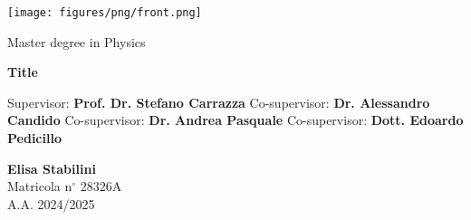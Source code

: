 \frontmatter
{
\thispagestyle{empty}

\centerline{
\texttt{[image: figures/png/front.png]}
}

\begin{center}
{\Large  Master degree in Physics }
\end{center}


\vskip1.5cm
\begin{center}
{\fontsize{15}{20}\selectfont \textbf{Title\\}}
\end{center}


{\large
\vskip 20mm Supervisor:
\vskip 0.2mm \large  \textbf{Prof. Dr. Stefano Carrazza}
\vskip 5mm
\large Co-supervisor:
\vskip 0.2mm
\large \textbf{Dr. Alessandro Candido}
\vskip 5mm
\large Co-supervisor:
\vskip 0.2mm
\large \textbf{Dr. Andrea Pasquale}
\vskip 5mm
\large Co-supervisor:
\vskip 0.2mm
\large \textbf{Dott. Edoardo Pedicillo}
}
}

\vskip 2cm
\noindent
\hfill
\parbox[t]{7cm}{
    \large
    \raggedright
    \textbf{Elisa Stabilini} \\
    Matricola n$^\circ$ $28326\mathrm{A}$ \\
    A.A. 2024/2025
}  
